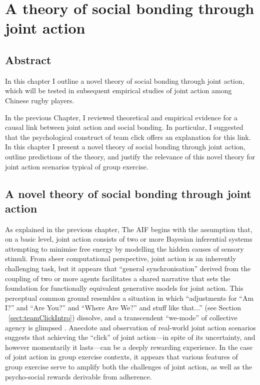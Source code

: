 \chapter{A theory of social bonding through joint action
\label{chap:theoryGE}}

\minitoc


  \begin{CJK}{UTF8}{gbsn}

\section{Abstract}
  In this chapter I outline a novel theory of social bonding through joint action, which will be tested in subsequent empirical studies of joint action among Chinese rugby players.

  In the previous Chapter, I reviewed theoretical and empirical evidence for a causal link between joint action and social bonding.  In particular, I suggested that the psychological construct of team click offers an explanation for this link. In this chapter I present a novel theory of social bonding through joint action, outline predictions of the theory, and justify the relevance of this novel theory for joint action scenarios typical of group exercise.




\section{A novel theory of social bonding through joint action\label{sect:novelTheory}}

As explained in the previous chapter, The AIF begins with the assumption that, on a basic level, joint action consists of two or more Bayesian inferential systems attempting to minimise free energy by modelling the hidden causes of sensory stimuli.  From sheer computational perspective, joint action is an inherently challenging task, but it appears that ``general synchronisation'' derived from the coupling of two or more agents facilitates a shared narrative that sets the foundation for functionally equivalent generative models for joint action.  This perceptual common ground resembles a situation in which ``adjustments for ``Am I?'' and ``Are You?'' and ``Where Are We?'' and stuff like that...'' (see Section ~\ref{sect:teamClickIntro}) dissolve, and a transcendent ``we-mode'' of collective agency is glimpsed \citep[][]{Friston2015}.  Anecdote and observation of real-world joint action scenarios suggests that achieving the ``click'' of joint action---in spite of its uncertainty, and however momentarily it lasts---can be a deeply rewarding experience.  In the case of joint action in group exercise contexts, it appears that various features of group exercise serve to amplify both the challenges of joint action, as well as the psycho-social rewards derivable from adherence.


\end{CJK}
